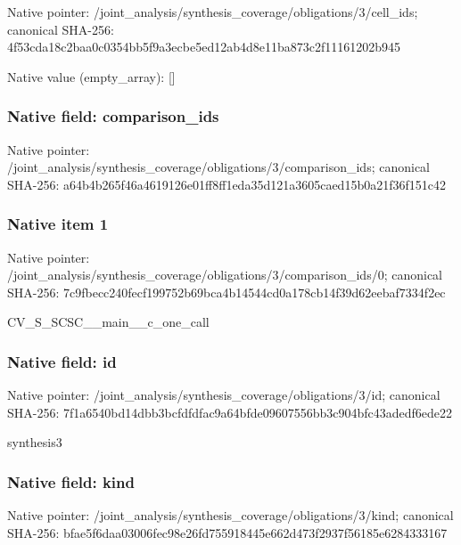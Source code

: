 \documentclass[10pt,a4paper]{article}
\begin{document}
Native pointer: /joint\_analysis/synthesi\allowbreak{}s\_coverage/obligations/3\allowbreak{}/cell\_ids; canonical SHA-256: 4f53cda18c2baa0c0354bb5f\allowbreak{}9a3ecbe5ed12ab4d8e11ba87\allowbreak{}3c2f11161202b945



Native value (empty\_array): []



\subsubsection{Native field: comparison\_ids}


Native pointer: /joint\_analysis/synthesi\allowbreak{}s\_coverage/obligations/3\allowbreak{}/comparison\_ids; canonical SHA-256: a64b4b265f46a4619126e01f\allowbreak{}f8ff1eda35d121a3605caed1\allowbreak{}5b0a21f36f151c42



\subsubsection{Native item 1}


Native pointer: /joint\_analysis/synthesi\allowbreak{}s\_coverage/obligations/3\allowbreak{}/comparison\_ids/0; canonical SHA-256: 7c9fbecc240fecf199752b69\allowbreak{}bca4b14544cd0a178cb14f39\allowbreak{}d62eebaf7334f2ec


CV\_S\_SCSC\_\_main\_\_c\_one\_call


\subsubsection{Native field: id}


Native pointer: /joint\_analysis/synthesi\allowbreak{}s\_coverage/obligations/3\allowbreak{}/id; canonical SHA-256: 7f1a6540bd14dbb3bcfdfdfa\allowbreak{}c9a64bfde09607556bb3c904\allowbreak{}bfc43adedf6ede22


synthesis3


\subsubsection{Native field: kind}


Native pointer: /joint\_analysis/synthesi\allowbreak{}s\_coverage/obligations/3\allowbreak{}/kind; canonical SHA-256: bfae5f6daa03006fec98e26f\allowbreak{}d755918445e662d473f2937f\allowbreak{}56185e6284333167
\end{document}
